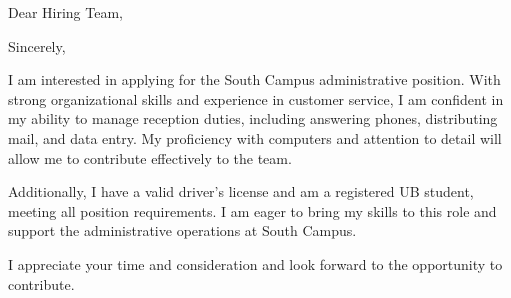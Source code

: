 \documentclass[11pt,a4paper,roman]{moderncv}
\begin{document}
\date{\today}
\opening{Dear Hiring Team,}
\closing{Sincerely,}
\makelettertitle

I am interested in applying for the South Campus administrative position. With strong organizational skills and experience in customer service, I am confident in my ability to manage reception duties, including answering phones, distributing mail, and data entry. My proficiency with computers and attention to detail will allow me to contribute effectively to the team.

Additionally, I have a valid driver’s license and am a registered UB student, meeting all position requirements. I am eager to bring my skills to this role and support the administrative operations at South Campus.

I appreciate your time and consideration and look forward to the opportunity to contribute.

\makeletterclosing
\end{document}
